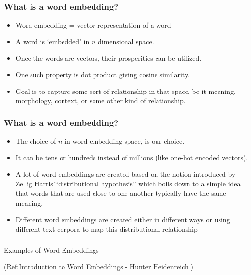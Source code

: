 \begin{frame}[fragile]\frametitle{What is a word embedding?}
  \begin{itemize}
    \item Word embedding = vector representation of a word
	\item A word is `embedded' in $n$ dimensional space.
	\item Once the words are vectors, their prosperities can be utilized.
	\item One such property is dot product giving cosine similarity.
	\item Goal is to capture some sort of relationship in that space, be it meaning, morphology, context, or some other kind of relationship.
  \end{itemize}


\end{frame}

\begin{frame}[fragile]\frametitle{What is a word embedding?}
  \begin{itemize}
    \item The choice of $n$ in word embedding space, is our choice.
	\item It can be tens or hundreds instead of millions (like one-hot encoded vectors).
	\item A lot of word embeddings are created based on the notion introduced by Zellig Harris'``distributional hypothesis'' which boils down to a simple idea that words that are used close to one another typically have the same meaning.
	\item Different word embeddings are created either in different ways or using different text corpora to map this distributional relationship
  \end{itemize}


\end{frame}


\begin{frame}[fragile]\frametitle{}

\begin{center}
{\Large Examples of Word Embeddings}

{\tiny (Ref:Introduction to Word Embeddings - Hunter Heidenreich )}

\end{center}

\end{frame}

